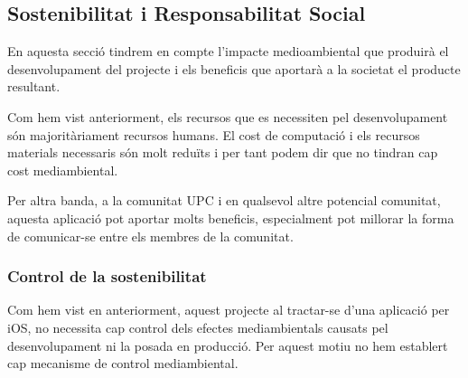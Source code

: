 \subsection{Sostenibilitat i Responsabilitat Social}

En aquesta secció tindrem en compte l'impacte medioambiental que produirà el desenvolupament del projecte i els beneficis que aportarà a la societat el producte resultant.

Com hem vist anteriorment, els recursos que es necessiten pel desenvolupament són majoritàriament recursos humans. El cost de computació i els recursos materials necessaris són molt reduïts i per tant podem dir que no tindran cap cost mediambiental.

Per altra banda, a la comunitat UPC i en qualsevol altre potencial comunitat, aquesta aplicació pot aportar molts beneficis, especialment pot millorar la forma de comunicar-se entre els membres de la comunitat.

\subsubsection{Control de la sostenibilitat}

Com hem vist en anteriorment, aquest projecte al tractar-se d'una aplicació per iOS, no necessita cap control dels efectes mediambientals causats pel desenvolupament ni la posada en producció. Per aquest motiu no hem establert cap mecanisme de control mediambiental.